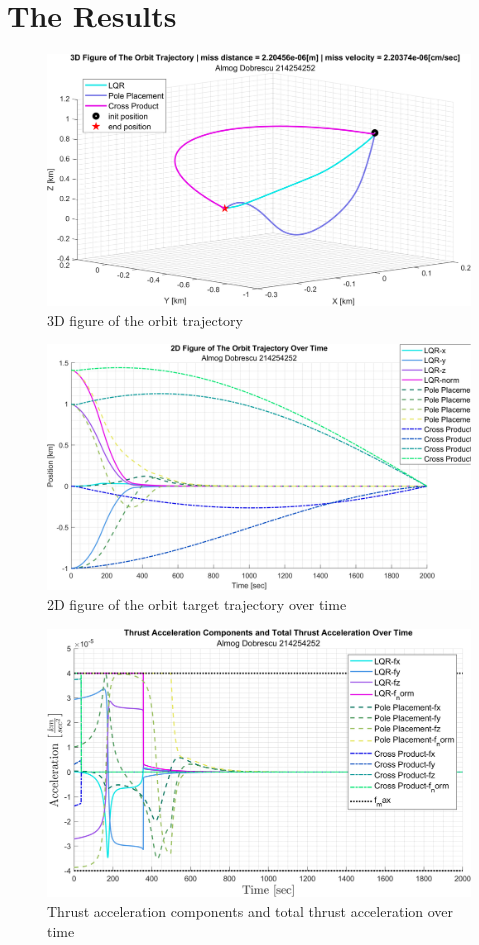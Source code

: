 \documentclass[11pt, a4paper]{article}
\begin{document}
\section{The Results}
\begin{figure}[H]
    \centering
    \includegraphics[width=1\textwidth]{images/graph1.png}
    \caption{3D figure of the orbit trajectory}
    \label{fig:3D-plot}
\end{figure}
\begin{figure}[H]
    \centering
    \includegraphics[width=1\textwidth]{images/graph2.png}
    \caption{2D figure of the orbit target trajectory over time}
    \label{fig:2D-plot_over_time}
\end{figure}
\begin{figure}[H]
    \centering
    \includegraphics[width=1\textwidth]{images/graph3.png}
    \caption{Thrust acceleration components and total thrust acceleration over time}
    \label{fig:accel_over_time}
\end{figure}
\end{document}
